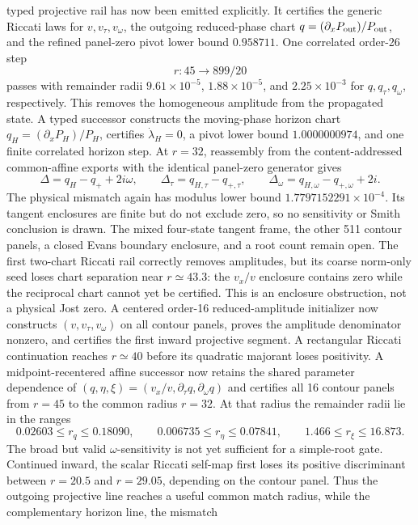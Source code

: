 \documentclass[11pt]{article}
\theoremstyle{definition}
\theoremstyle{remark}
\begin{document}
typed projective rail has now been emitted explicitly.  It certifies the
generic Riccati laws for \(v,v_\tau,v_\omega\), the outgoing reduced-phase
chart \(q=(\partial_xP_{\rm out})/P_{\rm out}\), and the refined panel-zero
pivot lower bound \(0.958711\).  One correlated order-26 step
\[
 r:45\longrightarrow899/20
\]
passes with remainder radii \(9.61\times10^{-5}\),
\(1.88\times10^{-5}\), and \(2.25\times10^{-3}\) for
\(q,q_\tau,q_\omega\), respectively.  This removes the homogeneous
amplitude from the propagated state.  A typed successor constructs the
moving-phase horizon chart \(q_H=(\partial_xP_H)/P_H\), certifies
\(\dot\lambda_H=0\), a pivot lower bound \(1.0000000974\), and one finite
correlated horizon step.  At \(r=32\), reassembly from the content-addressed
common-affine exports with the identical panel-zero generator gives
\[
 \Delta=q_H-q_++2i\omega,\qquad
 \Delta_\tau=q_{H,\tau}-q_{+,\tau},\qquad
 \Delta_\omega=q_{H,\omega}-q_{+,\omega}+2i .
\]
The physical mismatch again has modulus lower bound
\(1.7797152291\times10^{-4}\).  Its tangent enclosures are finite but do not
exclude zero, so no sensitivity or Smith conclusion is drawn.  The mixed
four-state tangent frame, the other 511 contour panels, a closed Evans
boundary enclosure, and a root count remain open.
The first two-chart Riccati rail correctly removes amplitudes, but its
coarse norm-only seed loses chart separation near \(r\simeq43.3\): the
\(v_x/v\) enclosure contains zero while the reciprocal chart cannot yet be
certified.  This is an enclosure obstruction, not a physical Jost zero.
A centered order-16 reduced-amplitude initializer now constructs
\((v,v_\tau,v_\omega)\) on all contour panels, proves the amplitude
denominator nonzero, and certifies the first inward projective segment.  A
rectangular Riccati continuation reaches \(r\simeq40\) before its quadratic
majorant loses positivity.  A midpoint-recentered affine successor now
retains the shared parameter dependence of
\((q,\eta,\xi)=(v_x/v,\partial_\tau q,\partial_\omega q)\) and certifies all
16 contour panels from \(r=45\) to the common radius \(r=32\).  At that
radius the remainder radii lie in the ranges
\[
 0.02603\le r_q\le0.18090,\qquad
 0.006735\le r_\eta\le0.07841,\qquad
 1.466\le r_\xi\le16.873 .
\]
The broad but valid \(\omega\)-sensitivity is not yet sufficient for a
simple-root gate.  Continued inward, the scalar Riccati self-map first loses
its positive discriminant between \(r=20.5\) and \(r=29.05\), depending on
the contour panel.  Thus the outgoing projective line reaches a useful
common match radius, while the complementary horizon line, the mismatch
\end{document}
